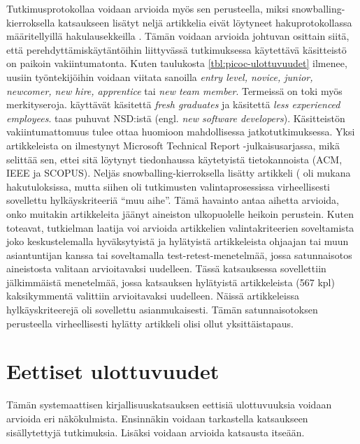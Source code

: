 \documentclass[utf8]{gradu3}
\begin{document}
Tutkimusprotokollaa voidaan arvioida myös sen perusteella, miksi snowballing-kierroksella katsaukseen lisätyt neljä artikkelia eivät löytyneet hakuprotokollassa määritellyillä hakulausekkeilla %
\parencites%
    {bjornson-dingsøyr-2005}%
    {kulkarni-ym-2010}%
    {hemphill-begel-2011}%
    {viviani-murphy-2019}%
\relax.
%
Tämän voidaan arvioida johtuvan osittain siitä, että perehdyttämiskäytäntöihin liittyvässä tutkimuksessa käytettävä käsitteistö on paikoin vakiintumatonta. Kuten taulukosta \ref{tbl:picoc-ulottuvuudet} ilmenee, uusiin työntekijöihin voidaan viitata sanoilla \textit{entry level, novice, junior, newcomer, new hire, apprentice} tai \textit{new team member}. Termeissä on toki myös merkityseroja. \textcite{kulkarni-ym-2010} käyttävät käsitettä \textit{fresh graduates} ja \textcite{bjornson-dingsøyr-2005} käsitettä \textit{less experienced employees}. \textcite{begel-simon-2008} taas puhuvat NSD:istä (engl. \textit{new software developers}). Käsitteistön vakiintumattomuus tulee ottaa huomioon mahdollisessa jatkotutkimuksessa. Yksi artikkeleista \parencite{hemphill-begel-2011} on ilmestynyt Microsoft Technical Report -julkaisusarjassa, mikä selittää sen, ettei sitä löytynyt tiedonhaussa käytetyistä tietokannoista (ACM, IEEE ja SCOPUS). Neljäs snowballing-kierroksella lisätty artikkeli (\textcite{viviani-murphy-2019} oli mukana hakutuloksissa, mutta siihen oli tutkimusten valintaprosessissa virheellisesti sovellettu hylkäyskriteeriä ``muu aihe''. Tämä havainto antaa aihetta arvioida, onko muitakin artikkeleita jäänyt aineiston ulkopuolelle heikoin perustein. Kuten \textcite{kitchenham-charters-2007} toteavat, tutkielman laatija voi arvioida artikkelien valintakriteerien soveltamista joko keskustelemalla hyväksytyistä ja hylätyistä artikkeleista ohjaajan tai muun asiantuntijan kanssa tai soveltamalla test-retest-menetelmää, jossa satunnaisotos aineistosta valitaan arvioitavaksi uudelleen. Tässä katsauksessa sovellettiin jälkimmäistä menetelmää, jossa katsauksen hylätyistä artikkeleista (567 kpl) kaksikymmentä valittiin arvioitavaksi uudelleen. Näissä artikkeleissa hylkäyskriteerejä oli sovellettu asianmukaisesti. Tämän satunnaisotoksen perusteella virheellisesti hylätty artikkeli \parencite{viviani-murphy-2019} olisi ollut yksittäistapaus. 


\section{Eettiset ulottuvuudet}

Tämän systemaattisen kirjallisuuskatsauksen eettisiä ulottuvuuksia voidaan arvioida eri näkökulmista. Ensinnäkin voidaan tarkastella katsaukseen sisällytettyjä tutkimuksia. Lisäksi voidaan arvioida katsausta itseään.
\end{document}
